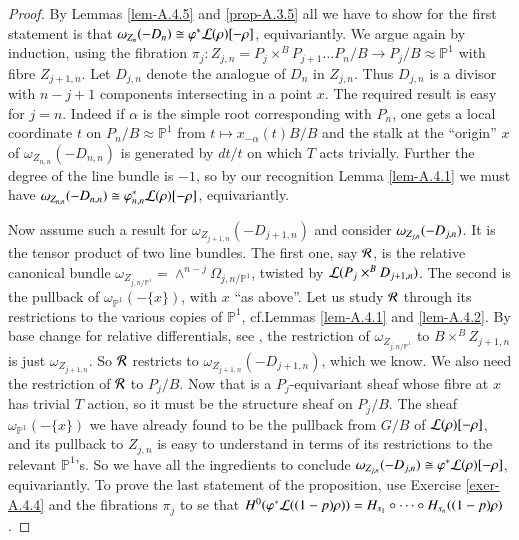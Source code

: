 \begin{proof}
By Lemmas \ref{lem-A.4.5} and \ref{prop-A.3.5} all we have to show for
the first statement is that $\omega_{Z_{n}}(-D_{n})\cong
\varphi^{*}\mathcal{L}(\rho)[-\rho]$, equivariantly. We argue again by
induction, using the fibration
$\pi_{j}:Z_{j,n}=P_{j}\times^{B}P_{j+1}\ldots P_{n}/B\to
P_{j}/B\approx \mathbb{P}^{1}$ with fibre $Z_{j+1,n}$. Let $D_{j,n}$
denote the analogue of $D_{n}$ in $Z_{j,n}$. Thus $D_{j,n}$ is a
divisor with $n-j+1$ components intersecting in a point $x$. The
required result is easy for $j=n$. Indeed if $\alpha$ is the simple
root corresponding with $P_{n}$, one gets a local coordinate $t$ on
$P_{n}/B\approx \mathbb{P}^{1}$ from $t\mapsto x_{-\alpha}(t)B/B$ and
the stalk at the ``origin'' $x$ of $\omega_{Z_{n,n}}(-D_{n,n})$ is
generated by $dt/t$ on which $T$ acts trivially. Further the degree of
the line bundle is $-1$, so by our recognition Lemma \ref{lem-A.4.1}
we must have $\omega_{Z_{n,n}}(-D_{n,n})\cong
\varphi^{*}_{n,n}\mathcal{L}(\rho)[-\rho]$, equivariantly.

Now assume such a result for $\omega_{Z_{j+1,n}}(-D_{j+1,n})$ and
consider $\omega_{Z_{j,n}}\break (-D_{j,n})$. It is the tensor product of two
line bundles. The first one, say $\mathcal{R}$, is the relative canonical
bundle
$\omega_{Z_{j,n/\mathbb{P}^{1}}}=\wedge^{n-j}\Omega_{j,n/\mathbb{P}^{1}}$,
  twisted by $\mathcal{L}(P_{j}\times^{B}D_{j+1,n})$. The second is the
  pullback of $\omega_{\mathbb{P}^{1}}(-\{x\})$, with $x$ ``as
  above''. Let us study $\mathcal{R}$ through its restrictions to the various
  copies of $\mathbb{P}^{1}$, cf.\@ Lemmas \ref{lem-A.4.1} and
  \ref{lem-A.4.2}. By base change for relative differentials, see
  \cite[II, 8.2]{key7}, the restriction of
  $\omega_{Z_{j,n/\mathbb{P}^{1}}}$ to $B\times^{B}Z_{j+1,n}$ is just
  $\omega_{Z_{j+1,n}}$. So $\mathcal{R}$ restricts to
  $\omega_{Z_{j+1,n}}(-D_{j+1,n})$, which we know. We also need the
  restriction of $\mathcal{R}$ to $P_{j}/B$. Now that is a $P_{j}$-equivariant
  sheaf whose fibre at $x$ has trivial $T$ action, so it must be the
  structure sheaf on $P_{j}/B$. The sheaf
  $\omega_{\mathbb{P}^{1}}(-\{x\})$ we have already found to be the
  pullback from $G/B$ of $\mathcal{L}(\rho)[-\rho]$, and its pullback to
  $Z_{j,n}$ is easy to understand in terms of its restrictions to the
  relevant $\mathbb{P}^{1}$'s. So we have all the ingredients to
  conclude $\omega_{Z_{j,n}}(-D_{j,n})\cong
  \varphi^{*}\mathcal{L}(\rho)[-\rho]$, equivariantly. To prove the last
  statement of the proposition, use Exercise \ref{exer-A.4.4} and the
  fibrations $\pi_{j}$ to se that
  $H^{0}(\varphi^{*}\mathcal{L}((1-p)\rho))=H_{s_{1}}\circ \cdots\circ
  H_{s_{n}}((1-p)\rho)$. 
\end{proof}


